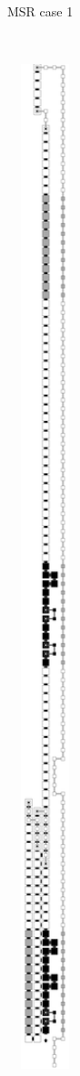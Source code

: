 \begin{figure}[H]
\begin{subfigure}[t]{0.24\textwidth}
        \caption{\label{fig:initial_case1_msr} MSR case 1}
    \end{subfigure}%
    ~
    \begin{subfigure}[t]{0.24\textwidth}
        \centering
        \includegraphics[width=0.24\textwidth]{initial_value_case2_msr}

\end{subfigure}
\end{figure}
